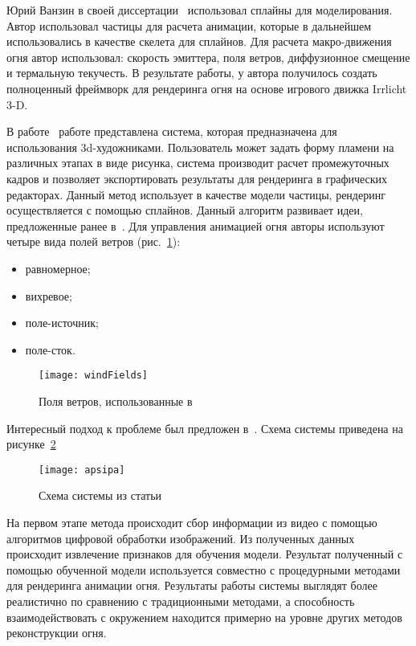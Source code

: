 Юрий Ванзин в своей диссертации~\cite{Vanzine2007RealisticRR} использовал
сплайны для моделирования. Автор использовал частицы для расчета анимации,
которые в дальнейшем использовались в качестве скелета для сплайнов. Для расчета
макро-движения огня автор использовал: скорость эмиттера, поля ветров,
диффузионное смещение и термальную текучесть. В результате работы, у автора
получилось создать полноценный фреймворк для рендеринга огня на основе игрового
движка Irrlicht 3-D.

В работе~\cite{turbulence} работе представлена система, которая предназначена
для использования 3d-художниками. Пользователь может задать форму пламени на
различных этапах в виде рисунка, система производит расчет промежуточных кадров
и позволяет экспортировать результаты для рендеринга в графических редакторах.
Данный метод использует в качестве модели частицы, рендеринг осуществляется с
помощью сплайнов. Данный алгоритм развивает идеи, предложенные ранее
в~\cite{Vanzine2007RealisticRR}. Для управления анимацией огня авторы используют
четыре вида полей ветров (рис.~\ref{fig:windFields}):
\begin{itemize}
    \item равномерное;
    \item вихревое;
    \item поле-источник;
    \item поле-сток.
\end{itemize}
\begin{figure}[htb]
	\centering
	\texttt{[image: windFields]}
    \caption{Поля ветров, использованные в~\cite{turbulence}}%
    \label{fig:windFields}
\end{figure}

Интересный подход к проблеме был предложен в~\cite{Lee2011ThreeDF}. Схема
системы приведена на рисунке~\ref{fig:apsipa}
\begin{figure}[htb]
	\centering
	\texttt{[image: apsipa]}
    \caption{Схема системы из статьи~\cite{Lee2011ThreeDF}}%
    \label{fig:apsipa}
\end{figure}
На первом этапе метода происходит сбор информации из видео с помощью алгоритмов
цифровой обработки изображений. Из полученных данных происходит извлечение
признаков для обучения модели. Результат полученный с помощью обученной модели
используется совместно с процедурными методами для рендеринга анимации огня.
Результаты работы системы выглядят более реалистично по сравнению с
традиционными методами, а способность взаимодействовать с окружением находится
примерно на уровне других методов реконструкции огня.

